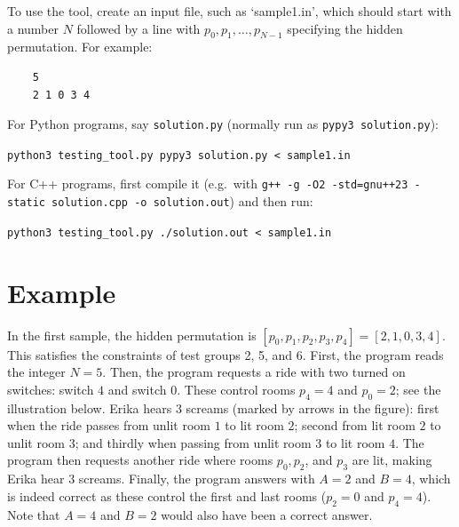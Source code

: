 To use the tool, create an input file, such as `sample1.in', which should start with a number $N$ followed by a line with $p_{0}, p_{1}, \ldots, p_{N-1}$ specifying the hidden permutation. For example:

\begin{verbatim}
    5
    2 1 0 3 4
 \end{verbatim}
 
 
 \noindent
 For Python programs, say \verb|solution.py| (normally run as \verb|pypy3 solution.py|):
 
     \verb|python3 testing_tool.py pypy3 solution.py < sample1.in|
 
 \noindent
 For C++ programs, first compile it
 (e.g.\ with \verb|g++ -g -O2 -std=gnu++23 -static solution.cpp -o solution.out|)
 and then run:
 
     \verb|python3 testing_tool.py ./solution.out < sample1.in|
 
\section*{Example}
In the first sample, the hidden permutation is $[p_{0},p_{1},p_{2},p_{3},p_{4}] = [2,1,0,3,4]$.
This satisfies the constraints of test groups 2, 5, and 6.
First, the program reads the integer $N = 5$. Then, the program requests a ride with two turned on switches: switch $4$ and switch $0$. These control rooms $p_{4} = 4$
and $p_{0} = 2$; see the illustration below. Erika hears $3$ screams (marked by arrows in the figure): first when the ride passes from unlit room $1$ to lit room $2$; second from lit room $2$ to unlit room $3$; and thirdly when passing from unlit room 3 to lit room $4$. The program then requests another ride where rooms $p_{0},p_{2}$, and $p_{3}$ are lit, making Erika hear $3$ screams. Finally, the program answers with $A = 2$ and $B = 4$, which is indeed correct as these control the first and last rooms ($p_{2} = 0$ and $p_{4} = 4$). Note that $A = 4$ and $B = 2$ would also have been a correct answer.

